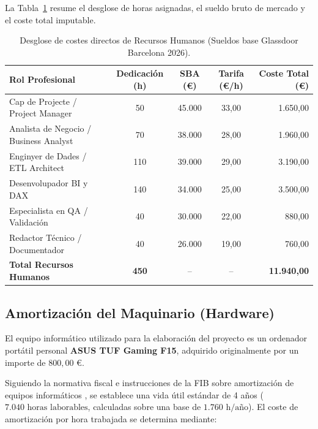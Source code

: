 \documentclass[12pt, a4paper, twoside]{report}
\begin{document}
La Tabla~\ref{tab:costes_rrhh} resume el desglose de horas asignadas, el sueldo bruto de mercado y el coste total imputable.

\begin{table}[h!]
\centering
\caption{Desglose de costes directos de Recursos Humanos (Sueldos base Glassdoor Barcelona 2026).}
\label{tab:costes_rrhh}
\small
\renewcommand{\arraystretch}{0.85}
\setlength{\tabcolsep}{4pt}
\begin{tabularx}{\textwidth}{@{} X c c c r @{}}
\toprule
\textbf{Rol Profesional} & \textbf{Dedicación (h)} & \textbf{SBA (€)} & \textbf{Tarifa (€/h)} & \textbf{Coste Total (€)} \\ \midrule
Cap de Projecte / Project Manager & 50 & 45.000 & 33,00 & 1.650,00 \\ \addlinespace[2pt]
Analista de Negocio / Business Analyst & 70 & 38.000 & 28,00 & 1.960,00 \\ \addlinespace[2pt]
Enginyer de Dades / ETL Architect & 110 & 39.000 & 29,00 & 3.190,00 \\ \addlinespace[2pt]
Desenvolupador BI y DAX & 140 & 34.000 & 25,00 & 3.500,00 \\ \addlinespace[2pt]
Especialista en QA / Validación & 40 & 30.000 & 22,00 & 880,00 \\ \addlinespace[2pt]
Redactor Técnico / Documentador & 40 & 26.000 & 19,00 & 760,00 \\ \midrule
\textbf{Total Recursos Humanos} & \textbf{450} & -- & -- & \textbf{11.940,00} \\ \bottomrule
\end{tabularx}
\end{table}

\subsection{Amortización del Maquinario (Hardware)}
El equipo informático utilizado para la elaboración del proyecto es un ordenador portátil personal \textbf{ASUS TUF Gaming F15}, adquirido originalmente por un importe de $800,00 \text{ €}$.

Siguiendo la normativa fiscal e instrucciones de la FIB sobre amortización de equipos informáticos \cite{fib_costos}, se establece una vida útil estándar de 4 años ($7.040 \text{ horas laborables}$, calculadas sobre una base de $1.760 \text{ h/año}$). El coste de amortización por hora trabajada se determina mediante:
\end{document}
